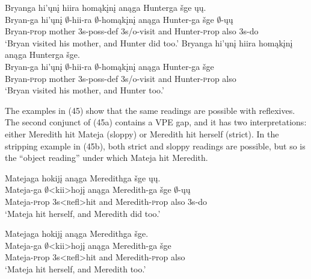 \documentclass[output=paper]{LSP/langsci}
\begin{document}
\begin{exe}
\ex
\begin{xlist}
\ex
\glll Bryanga hi'\k{u}n\k{i} hiira hom\k{a}k\k{i}n\k{i} an\k{a}ga Hunterga \v{s}ge \k{u}\k{u}.\\
Bryan-ga hi'\k{u}n\k{i} $\emptyset$-hii-ra $\emptyset$-hom\k{a}k\k{i}n\k{i} an\k{a}ga Hunter-ga \v{s}ge $\emptyset$-\k{u}\k{u}\\
Bryan-{\textsc prop} mother {\textsc 3s-poss-def} {\textsc 3s/o}-visit and Hunter-{\textsc prop} also {\textsc 3s}-do\\
\trans `Bryan visited his mother, and Hunter did too.'
\ex
\glll Bryanga hi'\k{u}n\k{i} hiira hom\k{a}k\k{i}n\k{i} an\k{a}ga Hunterga \v{s}ge.\\
Bryan-ga hi'\k{u}n\k{i} $\emptyset$-hii-ra $\emptyset$-hom\k{a}k\k{i}n\k{i} an\k{a}ga Hunter-ga \v{s}ge\\
Bryan-{\textsc prop} mother {\textsc 3s-poss-def} {\textsc 3s/o}-visit and Hunter-{\textsc prop} also\\
\trans `Bryan visited his mother, and Hunter too.'
\end{xlist}
\end{exe}

The examples in (45) show that the same readings are possible with reflexives. The second conjunct of (45a) contains a VPE gap, and it has two interpretations: either Meredith hit Mateja (sloppy) or Meredith hit herself (strict). In the stripping example in (45b), both strict and sloppy readings are possible, but so is the ``object reading'' under which Mateja hit Meredith.

\begin{exe}
\ex
\begin{xlist}
\ex
\glll Matejaga hokij\k{i} an\k{a}ga Meredithga \v{s}ge \k{u}\k{u}.\\
Mateja-ga $\emptyset$<kii>hoj\k{i} an\k{a}ga Meredith-ga \v{s}ge $\emptyset$-\k{u}\k{u}\\
Mateja-{\textsc prop} {\textsc 3s}<{\textsc refl}>hit and Meredith-{\textsc prop} also {\textsc 3s}-do\\
\trans `Mateja hit herself, and Meredith did too.'

\ex
\glll Matejaga hokij\k{i} an\k{a}ga Meredithga \v{s}ge.\\
Mateja-ga $\emptyset$<kii>hoj\k{i} an\k{a}ga Meredith-ga \v{s}ge\\ 
Mateja-{\textsc prop} {\textsc 3s}<{\textsc refl}>hit and Meredith-{\textsc prop} also\\ 
\trans `Mateja hit herself, and Meredith too.'
\end{xlist}
\end{exe}
\end{document}
